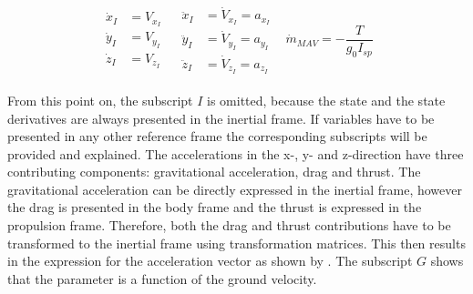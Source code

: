 \begin{align} \label{eq:state_derivatives}
\begin{split} 
\dot{x}_{I}&=V_{x_{I}}\\
\dot{y}_{I}&=V_{y_{I}}\\
\dot{z}_{I}&=V_{z_{I}}
\end{split} 
&
\begin{split}
\ddot{x}_{I}&=\dot{V}_{x_{I}}=a_{x_{I}}\\
\ddot{y}_{I}&=\dot{V}_{y_{I}}=a_{y_{I}}\\
\ddot{z}_{I}&=\dot{V}_{z_{I}}=a_{z_{I}}
\end{split}
&
\dot{m}_{MAV}=-\dfrac{T}{g_{0}I_{sp}}
\end{align}

From this point on, the subscript $I$ is omitted, because the state and the state derivatives are always presented in the inertial frame. If variables have to be presented in any other reference frame the corresponding subscripts will be provided and explained. The accelerations in the x-, y- and z-direction have three contributing components: gravitational acceleration, drag and thrust. The gravitational acceleration can be directly expressed in the inertial frame, however the drag is presented in the body frame and the thrust is expressed in the propulsion frame. Therefore, both the drag and thrust contributions have to be transformed to the inertial frame using transformation matrices. This then results in the expression for the acceleration vector as shown by . The subscript $G$ shows that the parameter is a function of the ground velocity.

